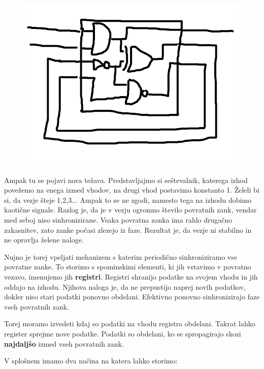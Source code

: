 \begin{figure}[H]
	\centering
	\includegraphics[width=0.7\linewidth]{slike/uvod/comb_fb}
	\caption{}
	\label{fig:comb}
\end{figure}


Ampak tu se pojavi nova težava. Predstavljajmo si seštevalnik, katerega izhod povežemo na enega izmed vhodov, na drugi vhod postavimo konstanto 1.
Želeli bi si, da vezje šteje 1,2,3... Ampak to se ne zgodi, namesto tega na izhodu dobimo kaotične signale. Razlog je, da je v vezju ogromno število povratnih zank, vendar med seboj niso sinhronizirane. Vsaka povratna zanka ima rahlo drugačno zakasnitev, zato zanke počasi zlezejo iz faze. Rezultat je, da vezje ni stabilno in ne opravlja želene naloge. 

Nujno je torej vpeljati mehanizem s katerim periodično sinhroniziramo vse povratne zanke. To storimo s spominskimi elementi, ki jih vstavimo v povratno vezavo, imenujemo jih \textbf{registri}. Registri shranijo podatke na svojem vhodu in jih oddajo na izhodu. Njihova naloga je, da ne prepustijo naprej novih podatkov, dokler niso stari podatki ponovno obdelani. Efektivno ponovno sinhronizirajo faze vseh povratnih zank.

Torej moramo izvedeti kdaj so podatki na vhodu registra obdelani. Takrat lahko register sprejme nove podatke. Podatki so obdelani, ko se spropagirajo skozi \textbf{najdaljšo} izmed vseh povratnih zank.

V splošnem imamo dva načina na katera lahko storimo:


